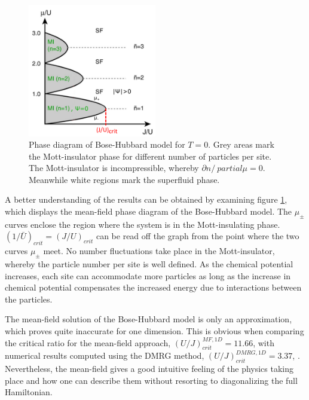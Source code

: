\begin{figure}[h]
	\centering
	\includegraphics[width = 0.5\textwidth]{Figures/SFMottPhase.pdf}
	\caption{Phase diagram of Bose-Hubbard model for $T = 0$. Grey areas mark the Mott-insulator phase for different number of particles per site. The Mott-insulator is incompressible, whereby $\partial n / \ partial \mu = 0$. Meanwhile white regions mark the superfluid phase. \cite{greiner}}
	\label{fig:MeanFieldPhaseDiagram}
\end{figure}
A better understanding of the results can be obtained by examining figure \ref{fig:MeanFieldPhaseDiagram}, which displays the mean-field phase diagram of the Bose-Hubbard model. 
The $\mu_{\pm}$ curves enclose the region where the system is in the Mott-insulating phase. $(1/\bar{U})_{crit} = (J/U)_{crit}$ can be read off the graph from the point where the two curves $\mu_{\pm}$ meet. No number fluctuations take place in the Mott-insulator, whereby the particle number per site is well defined. As the chemical potential increases, each site can accommodate more particles as long as the increase in chemical potential compensates the increased energy due to interactions between the particles.

The mean-field solution of the Bose-Hubbard model is only an approximation, which proves quite inaccurate for one dimension. This is obvious when comparing the critical ratio for the mean-field approach, $\left( U/J \right)_{crit}^{MF,1D} = 11.66$, with numerical results computed using the DMRG method, $\left( U/J \right)_{crit}^{DMRG,1D} = 3.37$, \cite{Kuhner2000}. Nevertheless, the mean-field gives a good intuitive feeling of the physics taking place and how one can describe them without resorting to diagonalizing the full Hamiltonian.
